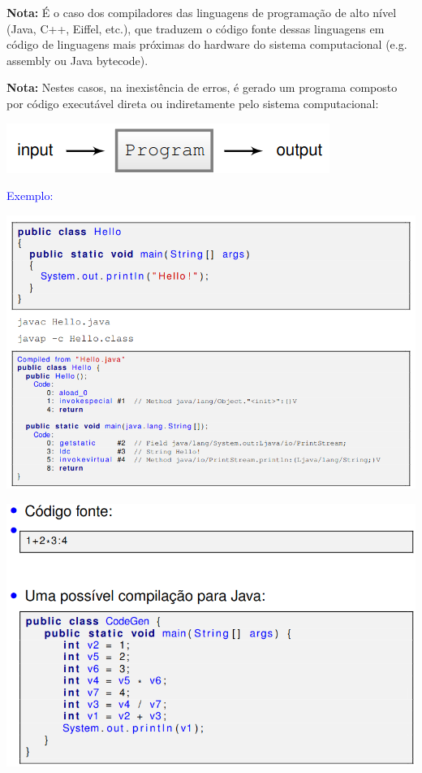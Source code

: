 \documentclass{article}
\begin{document}
\begin{flushleft}
  \textbf{Nota:} É o caso dos compiladores das linguagens de
  programação de alto nível (Java, C++, Eiffel, etc.), que
  traduzem o código fonte dessas linguagens em código de
  linguagens mais próximas do hardware do sistema
  computacional (e.g. assembly ou Java bytecode).
\end{flushleft}

\begin{flushleft}
  \textbf{Nota:} Nestes casos, na inexistência de erros, é gerado um
  programa composto por código executável direta ou
  indiretamente pelo sistema computacional:
\end{flushleft}

\begin{center}
  \includegraphics[scale=0.4]{2}
\end{center}

\begin{flushleft}
  \textcolor{Blue}{Exemplo:}
\end{flushleft}

\begin{center}
  \includegraphics[scale=0.3]{3}
\end{center}

\begin{center}
  \includegraphics[scale=0.3]{4}
\end{center}
\end{document}
